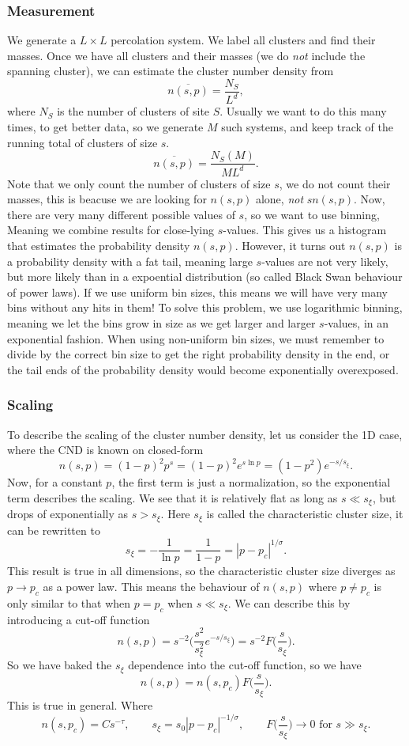 \documentclass[a4paper, 11pt, notitlepage, english]{article}
\begin{document}
\subsubsection*{Measurement}

We generate a $L\times L$ percolation system. We label all clusters and find their masses. Once we have all clusters and their masses (we do \emph{not} include the spanning cluster), we can estimate the cluster number density from
$$\overline{n(s,p)} = \frac{N_S}{L^{d}},$$
where $N_S$ is the number of clusters of site $S$. Usually we want to do this many times, to get better data, so we generate $M$ such systems, and keep track of the running total of clusters of size $s$.
$$\overline{n(s,p)} = \frac{N_S(M)}{ML^{d}}.$$
Note that we only count the number of clusters of size $s$, we do not count their masses, this is beacuse we are looking for $n(s,p)$ alone, \emph{not} $sn(s,p)$. Now, there are very many different possible values of $s$, so we want to use binning, Meaning we combine results for close-lying $s$-values. This gives us a histogram that estimates the probability density $n(s,p)$. However, it turns out $n(s,p)$ is a probability density with a fat tail, meaning large $s$-values are not very likely, but more likely than in a expoential distribution (so called Black Swan behaviour of power laws). If we use uniform bin sizes, this means we will have very many bins without any hits in them! To solve this problem, we use logarithmic binning, meaning we let the bins grow in size as we get larger and larger $s$-values, in an exponential fashion. When using non-uniform bin sizes, we must remember to divide by the correct bin size to get the right probability density in the end, or the tail ends of the probability density would become exponentially overexposed.

\subsubsection*{Scaling}
To describe the scaling of the cluster number density, let us consider the 1D case, where the CND is known on closed-form
$$n(s,p) = (1-p)^2 p^s = (1-p)^2 e^{s \ln p} = (1-p^2) e^{-s/s_\xi}.$$
Now, for a constant $p$, the first term is just a normalization, so the exponential term describes the scaling. We see that it is relatively flat as long as $s \ll s_\xi$, but drops of exponentially as $s > s_\xi$. Here $s_\xi$ is called the characteristic cluster size, it can be rewritten to
$$s_\xi = -\frac{1}{\ln p} = \frac{1}{1-p} = |p-p_c|^{1/\sigma}.$$
This result is true in all dimensions, so the characteristic cluster size diverges as $p\to p_c$ as a power law. This means the behaviour of $n(s,p)$ where $p \neq p_c$ is only similar to that when $p=p_c$ when $s \ll s_\xi$. We can describe this by introducing a cut-off function
$$n(s,p) = s^{-2} \bigg(\frac{s^2}{s_\xi^2} e^{-s/s_\xi} \bigg) = s^{-2} F\bigg(\frac{s}{s_\xi}\bigg).$$
So we have baked the $s_\xi$ dependence into the cut-off function, so we have
$$n(s,p) = n(s,p_c) F\bigg(\frac{s}{s_\xi}\bigg).$$
This is true in general. Where
$$n(s,p_c) = Cs^{-\tau}, \qquad s_\xi = s_0|p-p_c|^{-1/\sigma}, \qquad F\bigg(\frac{s}{s_\xi}\bigg)\to 0 \mbox{ for } s\gg s_\xi.$$
\end{document}
